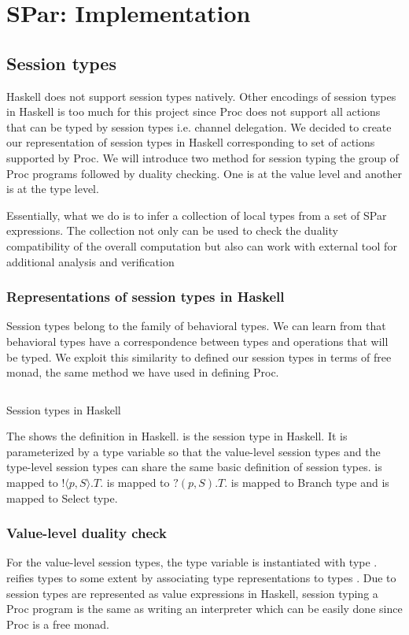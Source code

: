 \chapter{SPar: Implementation} \label{chap:impl}
\section{Session types} \label{impl:sec:session}
Haskell does not support session types natively. Other encodings of session types in Haskell is too much for this project since Proc does not support all actions that can be typed by session types i.e. channel delegation. We decided to create our representation of session types in Haskell corresponding to set of actions supported by Proc. We will introduce two method for session typing the group of Proc programs followed by duality checking. One is at the value level and another is at the type level.

Essentially, what we do is to infer a collection of local types from a set of SPar expressions. The collection not only can be used to check the duality compatibility of the overall computation but also can work with external tool \cite{langeVerifyingAsynchronousInteractions2019} for additional analysis and verification
\subsection{Representations of session types in Haskell}
Session types belong to the family of behavioral types. We can learn from  that behavioral types have a correspondence between types and operations that will be typed. We exploit this similarity to defined our session types in terms of free monad, the same method we have used in defining Proc.

\begin{listing}[ht]
    \inputminted{Haskell}{impl/type.hs}
    \caption{Session types in Haskell}
    \label{impl:code:type}
\end{listing}

The  shows the definition in Haskell.  is the session type in Haskell. It is parameterized by a type variable  so that the value-level session types and the type-level session types can share the same basic definition of session types.  is mapped to $! \langle p, S \rangle . T$.  is mapped to $?(p, S).T$.  is mapped to Branch type and  is mapped to Select type.
\subsection{Value-level duality check}
For the value-level session types, the type variable  is instantiated with type .  reifies types to some extent by associating type representations to types \cite{DataTypeable}. Due to session types are represented as value expressions in Haskell, session typing a Proc program is the same as writing an interpreter which can be easily done since Proc is a free monad. 

